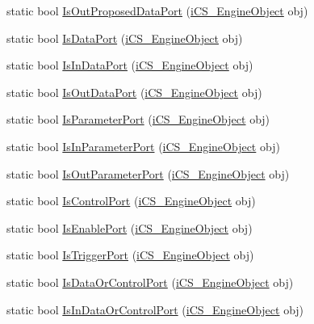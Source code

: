 \begin{DoxyCompactItemize}
\item 
static bool \hyperlink{classi_c_s___object_type_a667506181b99ba3a7d54b9cdfa1e682f}{Is\+Out\+Proposed\+Data\+Port} (\hyperlink{classi_c_s___engine_object}{i\+C\+S\+\_\+\+Engine\+Object} obj)
\item 
static bool \hyperlink{classi_c_s___object_type_aac0aa5ef1c8e1f8714911d622b879a1d}{Is\+Data\+Port} (\hyperlink{classi_c_s___engine_object}{i\+C\+S\+\_\+\+Engine\+Object} obj)
\item 
static bool \hyperlink{classi_c_s___object_type_a44adc77867bbc57f35efb001e84b4fa2}{Is\+In\+Data\+Port} (\hyperlink{classi_c_s___engine_object}{i\+C\+S\+\_\+\+Engine\+Object} obj)
\item 
static bool \hyperlink{classi_c_s___object_type_a8b961a2efd475fe52f88eed52c2d3334}{Is\+Out\+Data\+Port} (\hyperlink{classi_c_s___engine_object}{i\+C\+S\+\_\+\+Engine\+Object} obj)
\item 
static bool \hyperlink{classi_c_s___object_type_a061857e4867d7913a4686fffefd58f6a}{Is\+Parameter\+Port} (\hyperlink{classi_c_s___engine_object}{i\+C\+S\+\_\+\+Engine\+Object} obj)
\item 
static bool \hyperlink{classi_c_s___object_type_acde82d4104469e9ba372e24b3f9dfb79}{Is\+In\+Parameter\+Port} (\hyperlink{classi_c_s___engine_object}{i\+C\+S\+\_\+\+Engine\+Object} obj)
\item 
static bool \hyperlink{classi_c_s___object_type_a49adec8502716d40a5f8553097ef152f}{Is\+Out\+Parameter\+Port} (\hyperlink{classi_c_s___engine_object}{i\+C\+S\+\_\+\+Engine\+Object} obj)
\item 
static bool \hyperlink{classi_c_s___object_type_ac42de485fa1839ea7cf95ec6c54d8963}{Is\+Control\+Port} (\hyperlink{classi_c_s___engine_object}{i\+C\+S\+\_\+\+Engine\+Object} obj)
\item 
static bool \hyperlink{classi_c_s___object_type_ac373b5731fb970cb9a1bfc375756cb6a}{Is\+Enable\+Port} (\hyperlink{classi_c_s___engine_object}{i\+C\+S\+\_\+\+Engine\+Object} obj)
\item 
static bool \hyperlink{classi_c_s___object_type_a6e32f931a8552ad14e29d8bd27f97610}{Is\+Trigger\+Port} (\hyperlink{classi_c_s___engine_object}{i\+C\+S\+\_\+\+Engine\+Object} obj)
\item 
static bool \hyperlink{classi_c_s___object_type_a636b1b9aba65eb51ccbdf4658bce2c21}{Is\+Data\+Or\+Control\+Port} (\hyperlink{classi_c_s___engine_object}{i\+C\+S\+\_\+\+Engine\+Object} obj)
\item 
static bool \hyperlink{classi_c_s___object_type_a66b1f2806e409d18129c8168dd6ba3f3}{Is\+In\+Data\+Or\+Control\+Port} (\hyperlink{classi_c_s___engine_object}{i\+C\+S\+\_\+\+Engine\+Object} obj)

\end{DoxyCompactItemize}
